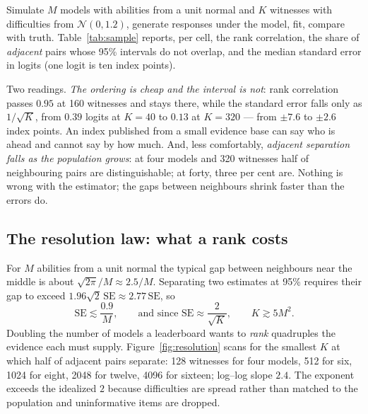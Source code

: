 \documentclass[11pt]{article}
\theoremstyle{definition}
\begin{document}
Simulate $M$ models with abilities from a unit normal and $K$ witnesses with difficulties from $\mathcal N(0, 1.2)$, generate responses under the model, fit, compare with truth. Table~\ref{tab:sample} reports, per cell, the rank correlation, the share of \emph{adjacent} pairs whose 95\% intervals do not overlap, and the median standard error in logits (one logit is ten index points).

\begin{table}[!htbp]\centering\small

\caption{Recovery against known truth: Spearman / share of adjacent pairs separated at 95\% / median standard error, at $M$ models and $K$ witnesses, median over 30 replications. Spearman is uninformative below about eight models --- with two or three, any estimator orders them almost surely --- which is why the middle number matters more.}
\label{tab:sample}
\end{table}

Two readings. \emph{The ordering is cheap and the interval is not}: rank correlation passes $0.95$ at 160 witnesses and stays there, while the standard error falls only as $1/\sqrt K$, from $0.39$ logits at $K = 40$ to $0.13$ at $K = 320$ --- from $\pm 7.6$ to $\pm 2.6$ index points. An index published from a small evidence base can say who is ahead and cannot say by how much. And, less comfortably, \emph{adjacent separation falls as the population grows}: at four models and 320 witnesses half of neighbouring pairs are distinguishable; at forty, three per cent are. Nothing is wrong with the estimator; the gaps between neighbours shrink faster than the errors do.

\subsection{The resolution law: what a rank costs}\label{sec:resolution}

For $M$ abilities from a unit normal the typical gap between neighbours near the middle is about $\sqrt{2\pi}/M \approx 2.5/M$. Separating two estimates at 95\% requires their gap to exceed $1.96\sqrt2\,\mathrm{SE} \approx 2.77\,\mathrm{SE}$, so
\[
\mathrm{SE} \lesssim \frac{0.9}{M}, \qquad \text{and since } \mathrm{SE} \approx \frac{2}{\sqrt K}, \qquad K \gtrsim 5M^2 .
\]
Doubling the number of models a leaderboard wants to \emph{rank} quadruples the evidence each must supply. Figure~\ref{fig:resolution} scans for the smallest $K$ at which half of adjacent pairs separate: 128 witnesses for four models, 512 for six, 1024 for eight, 2048 for twelve, 4096 for sixteen; log--log slope $2.4$. The exponent exceeds the idealized $2$ because difficulties are spread rather than matched to the population and uninformative items are dropped.
\end{document}
